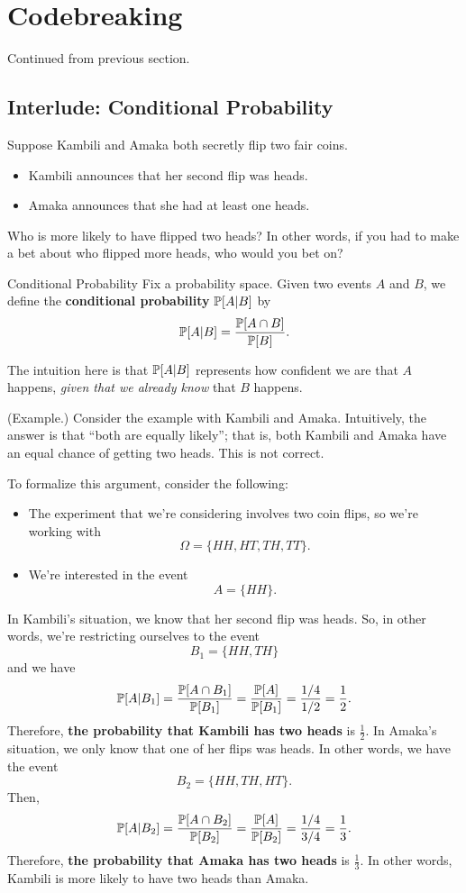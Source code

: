 \documentclass[letterpaper]{article}
\begin{document}
\section{Codebreaking}
Continued from previous section.

\subsection{Interlude: Conditional Probability}
Suppose Kambili and Amaka both secretly flip two fair coins. 
\begin{itemize}
    \item Kambili announces that her second flip was heads. 
    \item Amaka announces that she had at least one heads.
\end{itemize}
Who is more likely to have flipped two heads? In other words, if you had to make a bet about who flipped more heads, who would you bet on? 

\begin{definition}{Conditional Probability}{}
    Fix a probability space. Given two events $A$ and $B$, we define the \textbf{conditional probability} $\mathbb{P}[A | B]$ by 
    \[\mathbb{P}[A | B] = \frac{\mathbb{P}[A \cap B]}{\mathbb{P}[B]}.\]
\end{definition}
The intuition here is that $\mathbb{P}[A | B]$ represents how confident we are that $A$ happens, \emph{given that we already know} that $B$ happens.

\begin{mdframed}
    (Example.) Consider the example with Kambili and Amaka. Intuitively, the answer is that ``both are equally likely''; that is, both Kambili and Amaka have an equal chance of getting two heads. This is not correct. 

    \bigskip 

    To formalize this argument, consider the following: 
    \begin{itemize}
        \item The experiment that we're considering involves two coin flips, so we're working with 
        \[\Omega = \{HH, HT, TH, TT\}.\]
        \item We're interested in the event
        \[A = \{HH\}.\]
    \end{itemize}
    In Kambili's situation, we know that her second flip was heads. So, in other words, we're restricting ourselves to the event 
    \[B_1 = \{HH, TH\}\] and we have 
    \[\mathbb{P}[A | B_1] = \frac{\mathbb{P}[A \cap B_1]}{\mathbb{P}[B_1]} = \frac{\mathbb{P}[A]}{\mathbb{P}[B_1]} = \frac{1/4}{1/2} = \frac{1}{2}.\]
    Therefore, \textbf{the probability that Kambili has two heads} is $\frac{1}{2}$. In Amaka's situation, we only know that one of her flips was heads. In other words, we have the event 
    \[B_2 = \{HH, TH, HT\}.\]
    Then, 
    \[\mathbb{P}[A | B_2] = \frac{\mathbb{P}[A \cap B_2]}{\mathbb{P}[B_2]} = \frac{\mathbb{P}[A]}{\mathbb{P}[B_2]} = \frac{1/4}{3/4} = \frac{1}{3}.\]
    Therefore, \textbf{the probability that Amaka has two heads} is $\frac{1}{3}$. In other words, Kambili is more likely to have two heads than Amaka.  
\end{mdframed}
\end{document}
